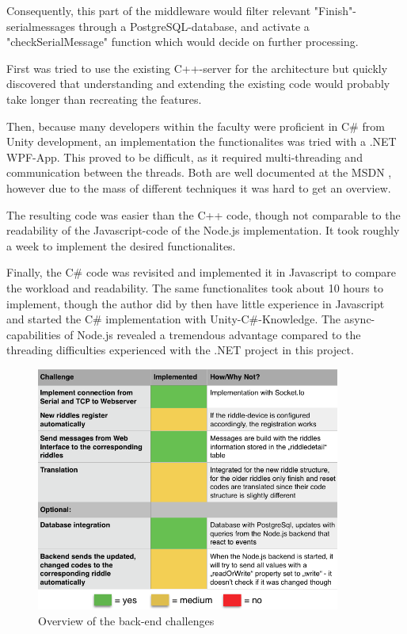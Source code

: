 Consequently, this part of the middleware would filter relevant "Finish"-serialmessages through a PostgreSQL-database, 
and activate a "checkSerialMessage" function which would decide on further processing.

First was tried to use the existing C++-server for the architecture but quickly discovered that understanding and extending the existing code would probably take longer than recreating the features.

Then, because many developers within the faculty were proficient in C\# from Unity development, an implementation the functionalites was tried with a .NET WPF-App.
This proved to be difficult, as it required multi-threading and communication between the threads. 
Both are well documented at the MSDN \parencite{MSDN},
however due to the mass of different techniques it was hard to get an overview.

The resulting code was easier than the C++ code, though not comparable to the readability of the Javascript-code of the Node.js implementation.
It took roughly a week to implement the desired functionalites.

Finally, the  C\# code was revisited and implemented it in Javascript to compare the workload and readability.
The same functionalites took about 10 hours to implement, though the author did by then have little experience in Javascript and started the C\# implementation with Unity-C\#-Knowledge.
The async-capabilities of Node.js revealed a tremendous advantage compared to the threading difficulties experienced with the .NET project in this project.


\begin{figure}[th]
	\centering
	\includegraphics[width=100mm,scale=1]{Figures/backendOverview}
	\decoRule
	\caption[PoC]{Overview of the back-end challenges}
	\label{fig:BackEndTable}
\end{figure}


